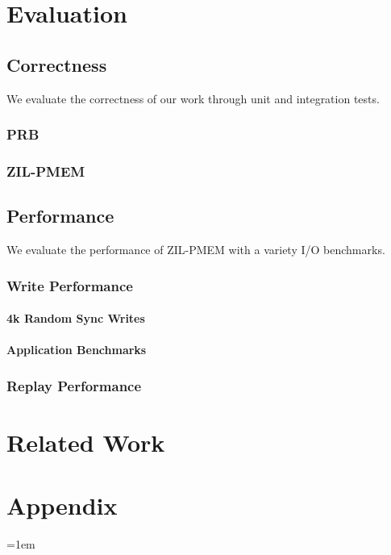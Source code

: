 \documentclass[12pt,a4paper,twoside]{book}
\begin{document}
\chapter{Evaluation}\label{ch:eval}
\section{Correctness}
We evaluate the correctness of our work through unit and integration tests.
\subsection{PRB}
\subsection{ZIL-PMEM}
\section{Performance}
We evaluate the performance of ZIL-PMEM with a variety I/O benchmarks.
\subsection{Write Performance}
\subsubsection{4k Random Sync Writes}
\subsubsection{Application Benchmarks}
\subsection{Replay Performance}

\chapter{Related Work}

\backmatter

\chapter{Appendix}\label{ch:appendix}

\cleardoublepage
{}
{}
\emergencystretch=1em
\printbibliography
\end{document}
